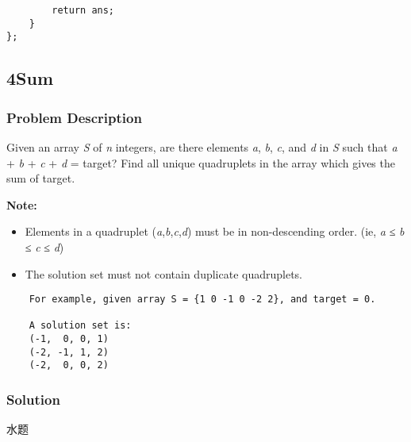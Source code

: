 \documentclass[courier]{article}
\begin{document}
\begin{CJK*}{UTF8}{gkai}
\begin{lstlisting}
        return ans;
    }
}; 
\end{lstlisting}


\subsection{ 4Sum }

\subsubsection*{Problem Description}
Given an array \emph{S} of \emph{n} integers, are there elements \emph{a}, \emph{b}, \emph{c}, and \emph{d} in \emph{S} such that \emph{a} + \emph{b} + \emph{c} + \emph{d} = target? Find all unique quadruplets in the array which gives the sum of target.

\textbf{Note:}



\begin{itemize}
\item Elements in a quadruplet (\emph{a},\emph{b},\emph{c},\emph{d}) must be in non-descending order. (ie, \emph{a} ≤ \emph{b} ≤ \emph{c} ≤ \emph{d})
\item The solution set must not contain duplicate quadruplets.
\end{itemize}

\begin{verbatim}
    For example, given array S = {1 0 -1 0 -2 2}, and target = 0.

    A solution set is:
    (-1,  0, 0, 1)
    (-2, -1, 1, 2)
    (-2,  0, 0, 2)
\end{verbatim}


\subsubsection*{Solution}
水题


\end{CJK*}
\end{document}
